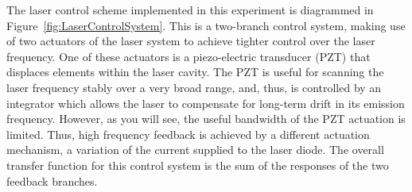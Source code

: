 \documentclass{../lab}
\begin{document}
The laser control scheme implemented in this experiment is diagrammed in Figure~\ref{fig:LaserControlSystem}. This is a two-branch control system, making use of two actuators of the laser system to achieve tighter control over the laser frequency. One of these actuators is a piezo-electric transducer (PZT) that displaces elements within the laser cavity. The PZT is useful for scanning the laser frequency stably over a very broad range, and, thus, is controlled by an integrator which allows the laser to compensate for long-term drift in its emission frequency. However, as you will see, the useful bandwidth of the PZT actuation is limited. Thus, high frequency feedback is achieved by a different actuation mechanism, a variation of the current supplied to the laser diode. The overall transfer function for this control system is the sum of the responses of the two feedback branches.


\end{document}
